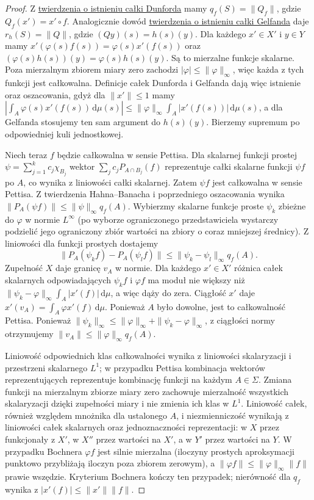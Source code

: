 \begin{proof}
Z \hyperref[thm:dunford-closedgraph15b]{twierdzenia o istnieniu całki Dunforda}
mamy $q_f(S)=\|Q_f\|$, gdzie $Q_f(x')=x'\circ f$.
Analogicznie dowód
\hyperref[thm:gelfand-exists15b]{twierdzenia o istnieniu całki Gelfanda}
daje $r_h(S)=\|Q\|$, gdzie $(Qy)(s)=h(s)(y)$.
Dla każdego $x'\in X'$ i $y\in Y$ mamy
$x'(\varphi(s)f(s))=\varphi(s)x'(f(s))$ oraz
$(\varphi(s)h(s))(y)=\varphi(s)h(s)(y)$.
Są to mierzalne funkcje skalarne. Poza mierzalnym
zbiorem miary zero zachodzi $|\varphi|\le\|\varphi\|_\infty$,
więc każda z tych funkcji jest całkowalna. Definicje
całek Dunforda i Gelfanda dają więc istnienie oraz
oszacowania, gdyż dla $\|x'\|\le1$ mamy
$|\int_A\varphi(s)x'(f(s))\,\mathrm d\mu(s)|
\le\|\varphi\|_\infty\int_A|x'(f(s))|\,\mathrm d\mu(s)$,
a dla Gelfanda stosujemy ten sam argument do $h(s)(y)$.
Bierzemy supremum po odpowiedniej kuli jednostkowej.

Niech teraz $f$ będzie całkowalna w sensie Pettisa.
Dla skalarnej funkcji prostej
$\psi=\sum_{j=1}^k c_j\chi_{B_j}$ wektor
$\sum_j c_j P_{A\cap B_j}(f)$ reprezentuje całki skalarne
funkcji $\psi f$ po $A$, co wynika z liniowości
całki skalarnej. Zatem $\psi f$ jest całkowalna w sensie
Pettisa. Z twierdzenia Hahna--Banacha i poprzedniego
oszacowania wynika
$\|P_A(\psi f)\|\le\|\psi\|_\infty q_f(A)$.
Wybierzmy skalarne funkcje proste $\psi_k$ zbieżne do
$\varphi$ w normie $L^\infty$ (po wyborze ograniczonego
przedstawiciela wystarczy podzielić jego ograniczony
zbiór wartości na zbiory o coraz mniejszej średnicy).
Z liniowości dla funkcji prostych dostajemy
\[
 \|P_A(\psi_k f)-P_A(\psi_l f)\|
 \le\|\psi_k-\psi_l\|_\infty q_f(A).
\]
Zupełność $X$ daje granicę $v_A$ w normie. Dla każdego
$x'\in X'$ różnica całek skalarnych odpowiadających
$\psi_k f$ i $\varphi f$ ma moduł nie większy niż
$\|\psi_k-\varphi\|_\infty\int_A|x'(f)|\,\mathrm d\mu$,
a więc dąży do zera. Ciągłość $x'$ daje
$x'(v_A)=\int_A\varphi x'(f)\,\mathrm d\mu$.
Ponieważ $A$ było dowolne, jest to całkowalność Pettisa.
Ponieważ $\|\psi_k\|_\infty\le\|\varphi\|_\infty+
\|\psi_k-\varphi\|_\infty$, z ciągłości normy otrzymujemy
$\|v_A\|\le\|\varphi\|_\infty q_f(A)$.

Liniowość odpowiednich klas całkowalności wynika
z liniowości skalaryzacji i przestrzeni skalarnego $L^1$;
w przypadku Pettisa kombinacja wektorów reprezentujących
reprezentuje kombinację funkcji na każdym $A\in\Sigma$.
Zmiana funkcji na mierzalnym zbiorze miary zero zachowuje
mierzalność wszystkich skalaryzacji dzięki zupełności miary
i nie zmienia ich klas w $L^1$. Liniowość całek, również
względem mnożnika dla ustalonego $A$, i niezmienniczość
wynikają z liniowości całek skalarnych oraz jednoznaczności reprezentacji: w $X$ przez
funkcjonały z $X'$, w $X''$ przez wartości na $X'$, a
w $Y'$ przez wartości na $Y$. W przypadku Bochnera
$\varphi f$ jest silnie mierzalna (iloczyny prostych
aproksymacji punktowo przybliżają iloczyn poza zbiorem
zerowym), a $\|\varphi f\|\le\|\varphi\|_\infty\|f\|$
prawie wszędzie. Kryterium Bochnera kończy ten przypadek;
nierówność dla $q_f$ wynika z $|x'(f)|\le\|x'\|\|f\|$.
\end{proof}

